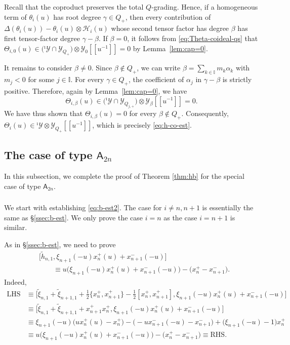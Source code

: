 \documentclass[11pt,reqno]{amsart}
\numberwithin{equation}{section}
\theoremstyle{definition}
\theoremstyle{remark}
\newcommand{\mc}{\mathcal}
\newcommand{\tl}{\tilde}
\newcommand{\I}{{\mathbb I}}
\newcommand{\Y}{{\mathscr{Y}}}
\newcommand{\Yi}{{^\imath\mathscr{Y}}}
\begin{document}
Recall that the coproduct preserves the total $Q$-grading. Hence, if
a homogeneous term of $\theta_i(u)$ has root degree $\gamma\in Q_+$,
then every contribution of
$\Delta(\theta_i(u))-\theta_i(u)\otimes \mc H_i(u)$ whose second tensor
factor has degree $\beta$ has first tensor-factor degree
$\gamma-\beta$. If $\beta=0$, it follows from
\eqref{eq:Theta-coideal-qs} that $\Theta_{i,0}(u)
\in
\bigl(\Yi\cap\Y_{Q_+}\bigr)
\otimes\Y_0[\![u^{-1}]\!]
=0$
by Lemma~\ref{lem:cap=0}.

It remains to consider $\beta\neq0$. Since
$\beta\notin Q_+$, we can write
$\beta=\sum_{k\in\I}m_k\alpha_k$ with $m_j<0$ for some $j\in\I$.
For every $\gamma\in Q_+$, the coefficient of $\alpha_j$ in
$\gamma-\beta$ is strictly positive. Therefore, again by Lemma~\ref{lem:cap=0}, we have
\[
\Theta_{i,\beta}(u)
\in
\bigl(\Yi\cap\Y_{Q_{j,+}}\bigr)
\otimes\Y_\beta[\![u^{-1}]\!]
=0.
\]
We have thus shown that
$\Theta_{i,\beta}(u)=0$ for every $\beta\notin Q_+$. Consequently, $\Theta_i(u)
\in\Yi\otimes\Y_{Q_+}[\![u^{-1}]\!]$,
which is precisely \eqref{eq:h-co-est}.


\subsection{The case of type $\mathsf A_{2n}$}
In this subsection, we complete the proof of Theorem \ref{thm:hb} for the special case of type $\mathsf A_{2n}$.
\subsubsection{}
We start with establishing \eqref{eq:b-est2}. The case for $i\ne n,n+1$ is essentially the same as \S\ref{ssec:b-est}. We only prove the case $i=n$ as the case $i=n+1$ is similar.

As in \S\ref{ssec:b-est}, we need to prove
\begin{align*}
&\bigl[\tl h_{n,1},
\xi_{n+1}(-u)x_n^+(u)+x_{n+1}^-(-u)\bigr]\\
&\qquad\equiv
u\bigl(\xi_{n+1}(-u)x_n^+(u)+x_{n+1}^-(-u)\bigr)
-\bigl(x_n^+-x_{n+1}^-\bigr).
\end{align*}
Indeed,
\begin{align*}
\mathrm{LHS}
&\equiv
\bigl[
\tl\xi_{n,1}+\tl\xi_{n+1,1}
+\tfrac12\{x_n^+,x_{n+1}^+\}
-\tfrac12[x_n^+,x_{n+1}^+],
\xi_{n+1}(-u)x_n^+(u)+x_{n+1}^-(-u)
\bigr]\\
&\equiv
\bigl[
\tl\xi_{n,1}+\tl\xi_{n+1,1}+x_{n+1}^+x_n^+,
\xi_{n+1}(-u)x_n^+(u)+x_{n+1}^-(-u)
\bigr]\\
&\equiv
\xi_{n+1}(-u)\bigl(ux_n^+(u)-x_n^+\bigr)
-\bigl(-ux_{n+1}^-(-u)-x_{n+1}^-\bigr)
+\bigl(\xi_{n+1}(-u)-1\bigr)x_n^+\\
&\equiv
u\bigl(\xi_{n+1}(-u)x_n^+(u)+x_{n+1}^-(-u)\bigr)
-\bigl(x_n^+-x_{n+1}^-\bigr)
\equiv\mathrm{RHS}.
\end{align*}
\end{document}
